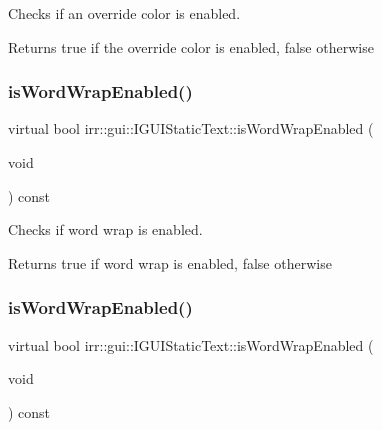Checks if an override color is enabled. 

\begin{DoxyReturn}{Returns}
true if the override color is enabled, false otherwise 
\end{DoxyReturn}
\mbox{\label{classirr_1_1gui_1_1IGUIStaticText_a42d7fbdb196414a1d95146b53e6a3528}} 
\subsubsection{\texorpdfstring{is\+Word\+Wrap\+Enabled()}{isWordWrapEnabled()}\hspace{0.1cm}{\footnotesize\ttfamily [1/2]}}
{\footnotesize\ttfamily virtual bool irr\+::gui\+::\+I\+G\+U\+I\+Static\+Text\+::is\+Word\+Wrap\+Enabled (\begin{DoxyParamCaption}\item[{void}]{ }\end{DoxyParamCaption}) const\hspace{0.3cm}{\ttfamily [pure virtual]}}



Checks if word wrap is enabled. 

\begin{DoxyReturn}{Returns}
true if word wrap is enabled, false otherwise 
\end{DoxyReturn}
\mbox{\label{classirr_1_1gui_1_1IGUIStaticText_a42d7fbdb196414a1d95146b53e6a3528}} 
\subsubsection{\texorpdfstring{is\+Word\+Wrap\+Enabled()}{isWordWrapEnabled()}\hspace{0.1cm}{\footnotesize\ttfamily [2/2]}}
{\footnotesize\ttfamily virtual bool irr\+::gui\+::\+I\+G\+U\+I\+Static\+Text\+::is\+Word\+Wrap\+Enabled (\begin{DoxyParamCaption}\item[{void}]{ }\end{DoxyParamCaption}) const\hspace{0.3cm}{\ttfamily [pure virtual]}}



